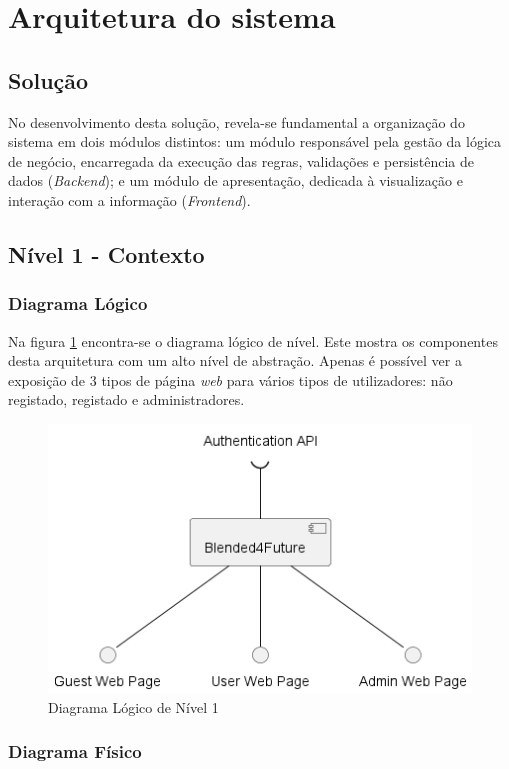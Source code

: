 \section{Arquitetura do sistema}


\subsection{Solução}

No desenvolvimento desta solução, revela-se fundamental a organização do sistema em dois módulos distintos: um módulo responsável pela gestão da lógica de negócio, encarregada da execução das regras, validações e persistência de dados (\textit{Backend}); e um módulo de apresentação, dedicada à visualização e interação com a informação (\textit{Frontend}).

\subsection{Nível 1 - Contexto}

\subsubsection{Diagrama Lógico}

Na figura \ref{fig:diagram-lvl1-logical} encontra-se o diagrama lógico de nível. Este mostra os componentes desta arquitetura com um alto nível de abstração. Apenas é possível ver a exposição de 3 tipos de página \textit{web} para vários tipos de utilizadores: não registado, registado e administradores.   

\begin{figure}[h!tbp]
    \centering
    \includegraphics[width=0.5\linewidth]{capitulos/cap3-analisedoproblema/assets/arquiteturasistema/logical/logical_l1.png}
    \caption{Diagrama Lógico de Nível 1}
    \label{fig:diagram-lvl1-logical}
\end{figure}

\subsubsection{Diagrama Físico} 

